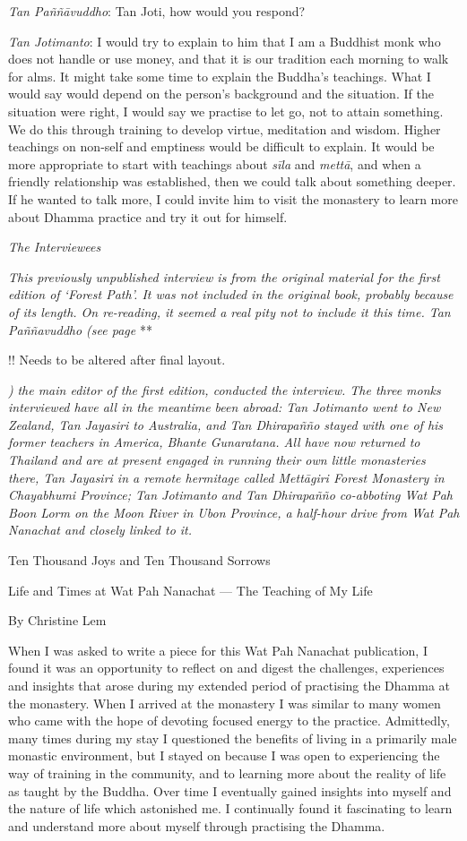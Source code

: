 \emph{Tan Paññāvuddho}‎: Tan Joti, how would you respond?

\emph{Tan Jotimanto}: I would try to explain to him that I am a Buddhist
monk who does not handle or use money, and that it is our tradition each
morning to walk for alms. It might take some time to explain the
Buddha's teachings. What I would say would depend on the person's
background and the situation. If the situation were right, I would say
we practise to let go, not to attain something. We do this through
training to develop virtue, meditation and wisdom. Higher teachings on
non-self and emptiness would be difficult to explain. It would be more
appropriate to start with teachings about \emph{sīla} and \emph{mettā},
and when a friendly relationship was established, then we could talk
about something deeper. If he wanted to talk more, I could invite him to
visit the monastery to learn more about Dhamma practice and try it out
for himself.

\emph{The Interviewees}

\emph{This previously unpublished interview is from the original
material for the first edition of `Forest Path'. It was not included in
the original book, probably because of its length. On re-reading, it
seemed a real pity not to include it this time. Tan Paññavuddho (see
page} **

!! Needs to be altered after final layout.

\emph{)} \emph{the main editor of the first edition, conducted the
interview. The three monks interviewed have all in the meantime been
abroad: Tan Jotimanto went to New Zealand, Tan Jayasiri to Australia,
and Tan Dhirapañño stayed with one of his former teachers in America,
Bhante Gunaratana. All have now returned to Thailand and are at present
engaged in running their own little monasteries there, Tan Jayasiri in a
remote hermitage called Mettāgiri Forest Monastery in Chayabhumi
Province; Tan Jotimanto and Tan Dhirapañño co-abboting Wat Pah Boon Lorm
on the Moon River in Ubon Province, a half-hour drive from Wat Pah
Nanachat and closely linked to it.}



Ten Thousand Joys and Ten Thousand Sorrows

Life and Times at Wat Pah Nanachat --- The Teaching of My Life

By Christine Lem

When I was asked to write a piece for this Wat Pah Nanachat publication,
I found it was an opportunity to reflect on and digest the challenges,
experiences and insights that arose during my extended period of
practising the Dhamma at the monastery. When I arrived at the monastery
I was similar to many women who came with the hope of devoting focused
energy to the practice. Admittedly, many times during my stay I
questioned the benefits of living in a primarily male monastic
environment, but I stayed on because I was open to experiencing the way
of training in the community, and to learning more about the reality of
life as taught by the Buddha. Over time I eventually gained insights
into myself and the nature of life which astonished me. I continually
found it fascinating to learn and understand more about myself through
practising the Dhamma.

